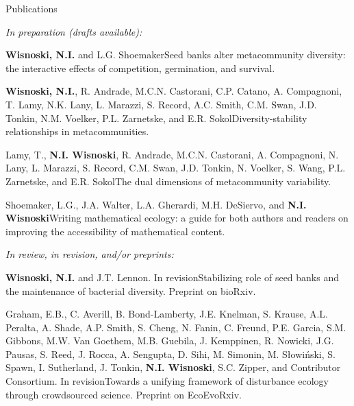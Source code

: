\documentclass{resume} %
\begin{document}
\begin{rhangSection}{Publications}

{\it In preparation (drafts available):}

\begin{Prep}{{\bf Wisnoski, N.I.} and L.G. Shoemaker}{Seed banks alter metacommunity diversity: the interactive effects of competition, germination, and survival.}
\end{Prep}

\begin{Prep}{{\bf Wisnoski, N.I.}, R. Andrade, M.C.N. Castorani, C.P. Catano, A. Compagnoni, T. Lamy, N.K. Lany, L. Marazzi, S. Record, A.C. Smith, C.M. Swan, J.D. Tonkin, N.M. Voelker, P.L. Zarnetske, and E.R. Sokol}{Diversity-stability relationships in metacommunities.}
\end{Prep}

\begin{Prep}{Lamy, T., {\bf N.I. Wisnoski}, R. Andrade, M.C.N. Castorani, A. Compagnoni, N. Lany, L. Marazzi, S. Record, C.M. Swan, J.D. Tonkin, N. Voelker, S. Wang, P.L. Zarnetske, and E.R. Sokol}{The dual dimensions of metacommunity variability.}
\end{Prep}

\begin{Prep}{Shoemaker, L.G., J.A. Walter, L.A. Gherardi, M.H. DeSiervo, and {\bf N.I. Wisnoski}}{Writing mathematical ecology: a guide for both authors and readers on improving the accessibility of mathematical content.}
\end{Prep}

\bigskip
\newpage
{\it In review, in revision, and/or preprints:}

\begin{Prep}{{\bf Wisnoski, N.I.} and J.T. Lennon. In revision}{Stabilizing role of seed banks and the maintenance of bacterial diversity. Preprint on bioRxiv.}
\end{Prep}

\begin{Prep}{Graham, E.B., C. Averill, B. Bond-Lamberty, J.E. Knelman, S. Krause, A.L. Peralta, A. Shade, A.P. Smith, S. Cheng, N. Fanin, C. Freund, P.E. Garcia, S.M. Gibbons, M.W. Van Goethem, M.B. Guebila, J. Kemppinen, R. Nowicki, J.G. Pausas, S. Reed, J. Rocca, A. Sengupta, D. Sihi, M. Simonin, M. Słowiński, S. Spawn, I. Sutherland, J. Tonkin, {\bf N.I. Wisnoski}, S.C. Zipper, and Contributor Consortium. In revision}{Towards a unifying framework of disturbance ecology through crowdsourced science. Preprint on EcoEvoRxiv.}
\end{Prep}


\end{rhangSection}
\end{document}
